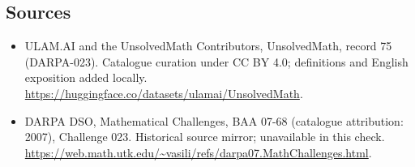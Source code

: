 \documentclass[11pt]{article}
\begin{document}
\subsection{Sources}
\begin{itemize}
\item[\hypertarget{source:75:1}{S1}] ULAM.AI and the UnsolvedMath Contributors, UnsolvedMath, record 75 (DARPA-023). Catalogue curation under CC BY 4.0; definitions and English exposition added locally.
\url{https://huggingface.co/datasets/ulamai/UnsolvedMath}.
\item[\hypertarget{source:75:2}{S2}] DARPA DSO, Mathematical Challenges, BAA 07-68 (catalogue attribution: 2007), Challenge 023. Historical source mirror; unavailable in this check.
\url{https://web.math.utk.edu/~vasili/refs/darpa07.MathChallenges.html}.
\end{itemize}
\label{end:75}
\end{document}
